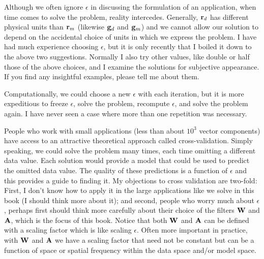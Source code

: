 Although we often ignore $\epsilon$ in discussing the formulation
of an application, when time comes to solve the problem, reality intercedes.
Generally, $\bold r_d$ has different physical units than $\bold r_m$
(likewise $\bold g_d$ and $\bold g_m$)
and we cannot allow our solution
to depend on the accidental choice of units
in which we express the problem.
I have had much experience choosing $\epsilon$, but it is
only recently that I boiled it down to the above two suggestions.
Normally I also try other values, like double or half those
of the above choices,
and I examine the solutions for subjective appearance.
If you find any insightful examples, please tell me about them.

\par
Computationally, we could choose a new $\epsilon$ with each iteration,
but it is more expeditious
to freeze $\epsilon$, solve the problem,
recompute $\epsilon$, and solve the problem again.
I have never seen a case where more than one repetition was necessary.

\par
People who work with small applications
(less than about $10^3$ vector components)
have access to an attractive theoretical approach
called cross-validation.
Simply speaking,
we could solve the problem many times,
each time omitting a different data value.
Each solution would provide a model
that could be used to predict
the omitted data value.
The quality of these predictions
is a function of $\epsilon$
and this provides a guide to finding it.
My objections to cross validation are two-fold:
First, I don't know how to apply it in the large applications
like we solve in this book
(I should think more about it);
and second,
people who worry much about $\epsilon$,
perhaps first should think 
more carefully about
their choice of the filters $\bold W$ and $\bold A$,
which is the focus of this book.
Notice that both $\bold W$ and $\bold A$
can be defined with a scaling factor which is like scaling $\epsilon$.
Often more important in practice,
with $\bold W$ and $\bold A$
we have a scaling factor that need not be constant but
can be a function of space or spatial frequency
within the data space and/or model space.


